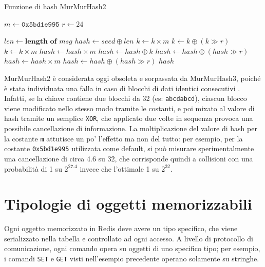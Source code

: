 \begin{algorithm}
\caption{Funzione di hash MurMurHash2}
\label{alg:murmurhash2}
\begin{algorithmic}[1]
	\State $m \gets \mathtt{0x5bd1e995}$ 
	\State $r \gets 24$ 

	\State $len \gets \textbf{length of}$ $msg$
	\State $hash \gets seed \oplus len$
	 
		\State $k \gets k \times m$
		\State $k \gets k \oplus (k \gg r)$
		\State $k \gets k \times m$
		\State $hash \gets hash \times m$
		\State $hash \gets hash \oplus k$
	\EndFor
	\State $hash \gets hash \oplus (hash \gg r)$ 
	\State $hash \gets hash \times m$
	\State $hash \gets hash \oplus (hash \gg r)$
	\State \Return $hash$
\EndProcedure
\end{algorithmic}
\end{algorithm}

MurMurHash2 è considerata oggi obsoleta e sorpassata da MurMurHash3, poiché è stata individuata una
falla in caso di blocchi di dati identici consecutivi \cite{murmur2flaw}. Infatti, se la chiave
contiene due blocchi da \SI{32}{\bit} (es: \verb|abcdabcd|), ciascun blocco viene modificato nello
stesso modo tramite le costanti, e poi mixato al valore di hash tramite un semplice \verb|XOR|, che
applicato due volte in sequenza provoca una possibile cancellazione di informazione. La
moltiplicazione del valore di hash per la costante \verb|m| attutisce un po' l'effetto ma non del
tutto: per esempio, per la costante \verb|0x5bd1e995| utilizzata come default, si può misurare
sperimentalmente una cancellazione di circa \SI{4.6}{\bit} su \num{32}, che corrisponde quindi a
collisioni con una probabilità di \num{1} su $2 ^ {27.4}$ invece che l'ottimale \num{1} su $2 ^
{32}$.

\section{Tipologie di oggetti memorizzabili}

Ogni oggetto memorizzato in Redis deve avere un tipo specifico, che viene serializzato
nella tabella e controllato ad ogni accesso. A livello di protocollo di comunicazione,
ogni comando opera su oggetti di uno specifico tipo; per esempio, i comandi \verb|SET|
e \verb|GET| visti nell'esempio precedente operano solamente su stringhe.


